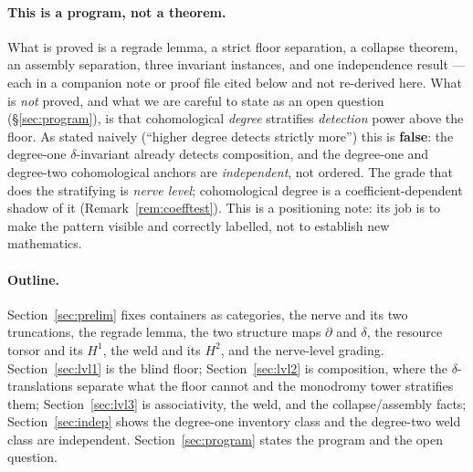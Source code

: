 \documentclass[11pt]{article}
\theoremstyle{definition}
\begin{document}
\paragraph{This is a program, not a theorem.}
What is proved is a regrade lemma, a strict floor separation, a collapse theorem, an assembly
separation, three invariant instances, and one independence result --- each in a companion note or
proof file cited below and not re-derived here. What is \emph{not} proved, and what we are careful to
state as an open question (\S\ref{sec:program}), is that cohomological \emph{degree} stratifies
\emph{detection} power above the floor. As stated naively (``higher degree detects strictly more'')
this is \textbf{false}: the degree-one $\delta$-invariant already detects composition, and the
degree-one and degree-two cohomological anchors are \emph{independent}, not ordered. The grade that
does the stratifying is \emph{nerve level}; cohomological degree is a coefficient-dependent shadow of
it (Remark~\ref{rem:coefftest}). This is a positioning note: its job is to make the pattern visible
and correctly labelled, not to establish new mathematics.

\paragraph{Outline.} Section~\ref{sec:prelim} fixes containers as categories, the nerve and its two
truncations, the regrade lemma, the two structure maps $\partial$ and $\delta$, the resource torsor
and its $H^1$, the weld and its $H^2$, and the nerve-level grading.
Section~\ref{sec:lvl1} is the blind floor; Section~\ref{sec:lvl2} is composition, where the
$\delta$-translations separate what the floor cannot and the monodromy tower stratifies them;
Section~\ref{sec:lvl3} is associativity, the weld, and the collapse/assembly facts;
Section~\ref{sec:indep} shows the degree-one inventory class and the degree-two weld class are
independent. Section~\ref{sec:program} states the program and the open question.
\end{document}
